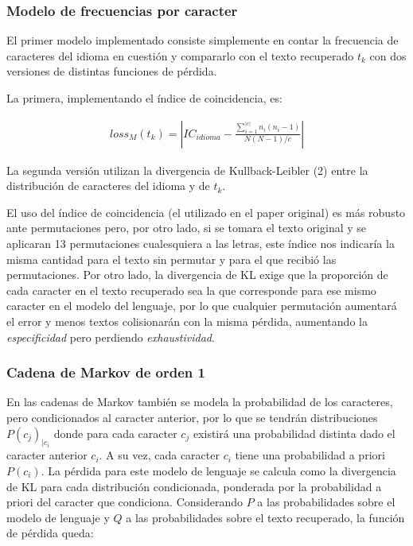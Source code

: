 \documentclass[a4paper,10pt]{article}
\begin{document}
\subsubsection{Modelo de frecuencias por caracter}

El primer modelo implementado consiste simplemente en contar la frecuencia de caracteres del idioma en cuestión y compararlo con el texto recuperado $t_k$ con dos versiones de distintas funciones de pérdida.

La primera, implementando el índice de coincidencia, es:

\begin{align}
    {loss_M}(t_k) = |{IC}_{idioma} - \frac{\sum_{i=1}^{|c|} n_i(n_i-1)}{N(N-1)/c}|
\end{align}

La segunda versión utilizan la divergencia de Kullback-Leibler (2) entre la distribución de caracteres del idioma y de $t_k$.

El uso del índice de coincidencia (el utilizado en el paper original) es más robusto ante permutaciones pero, por otro lado, si se tomara el texto original y se aplicaran 13 permutaciones cualesquiera a las letras, este índice nos indicaría la misma cantidad para el texto sin permutar y para el que recibió las permutaciones. Por otro lado, la divergencia de KL exige que la proporción de cada caracter en el texto recuperado sea la que corresponde para ese mismo caracter en el modelo del lenguaje, por lo que cualquier permutación aumentará el error y menos textos colisionarán con la misma pérdida, aumentando la \textit{especificidad} pero perdiendo \textit{exhaustividad}.

\subsubsection{Cadena de Markov de orden 1}

En las cadenas de Markov también se modela la probabilidad de los caracteres, pero condicionados al caracter anterior, por lo que se tendrán distribuciones $P(c_j)_{|c_i}$ donde para cada caracter $c_j$ existirá una probabilidad distinta dado el caracter anterior $c_i$. A su vez, cada caracter $c_i$ tiene una probabilidad a priori $P(c_i)$. La pérdida para este modelo de lenguaje se calcula como la divergencia de KL para cada distribución condicionada, ponderada por la probabilidad a priori del caracter que condiciona. Considerando $P$ a las probabilidades sobre el modelo de lenguaje y $Q$ a las probabilidades sobre el texto recuperado, la función de pérdida queda:
\end{document}
